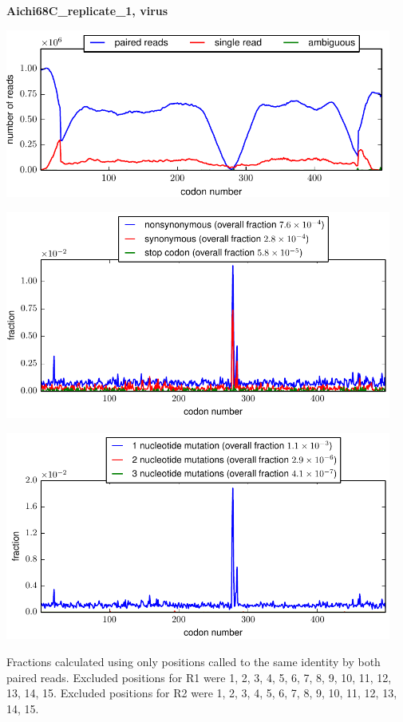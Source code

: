 \documentclass[10pt,letterpaper]{article}
\begin{document}
\centerline{\Large \bf Aichi68C\_replicate\_1, virus}
\vspace{0.1in}

\centerline{\includegraphics[width=5in]{Aichi68C_replicate_1_virus_codondepth.pdf}}
\vspace{0.1in}

\centerline{\includegraphics[width=5in]{Aichi68C_replicate_1_virus_syn-ns-dist.pdf}}
\vspace{0.1in}

\centerline{\includegraphics[width=5in]{Aichi68C_replicate_1_virus_nmutspercodon-dist.pdf}}
\vspace{0.1in}

Fractions calculated using only positions called to the same identity by both paired reads.  Excluded positions for R1 were 1, 2, 3, 4, 5, 6, 7, 8, 9, 10, 11, 12, 13, 14, 15. 
 Excluded positions for R2 were 1, 2, 3, 4, 5, 6, 7, 8, 9, 10, 11, 12, 13, 14, 15. 
\end{document}
